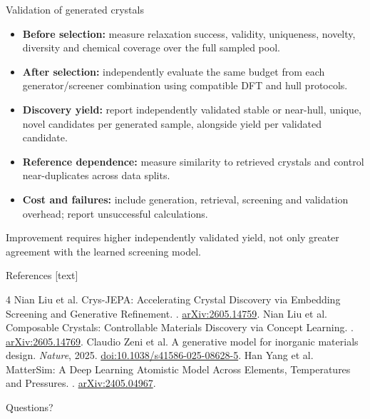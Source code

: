 \documentclass[10pt,aspectratio=169]{beamer}
\begin{document}
\begin{frame}{Validation of generated crystals}
\begin{itemize}\setlength\itemsep{3mm}
\item \textbf{Before selection:} measure relaxation success, validity, uniqueness, novelty, diversity and chemical coverage over the full sampled pool.
\item \textbf{After selection:} independently evaluate the same budget from each generator/screener combination using compatible DFT and hull protocols.
\item \textbf{Discovery yield:} report independently validated stable or near-hull, unique, novel candidates per generated sample, alongside yield per validated candidate.
\item \textbf{Reference dependence:} measure similarity to retrieved crystals and control near-duplicates across data splits.
\item \textbf{Cost and failures:} include generation, retrieval, screening and validation overhead; report unsuccessful calculations.
\end{itemize}
\vspace{3mm}
Improvement requires higher independently validated yield, not only greater agreement with the learned screening model.
\end{frame}

\begin{frame}{References}
\footnotesize
{}[text]
\begin{thebibliography}{4}
 Nian Liu et al.
\newblock Crys-JEPA: Accelerating Crystal Discovery via Embedding Screening and Generative Refinement.
. \href{https://arxiv.org/abs/2605.14759}{arXiv:2605.14759}.
 Nian Liu et al.
\newblock Composable Crystals: Controllable Materials Discovery via Concept Learning.
. \href{https://arxiv.org/abs/2605.14769}{arXiv:2605.14769}.
 Claudio Zeni et al.
\newblock A generative model for inorganic materials design.
\newblock \emph{Nature}, 2025. \href{https://doi.org/10.1038/s41586-025-08628-5}{doi:10.1038/s41586-025-08628-5}.
 Han Yang et al.
\newblock MatterSim: A Deep Learning Atomistic Model Across Elements, Temperatures and Pressures.
. \href{https://arxiv.org/abs/2405.04967}{arXiv:2405.04967}.
\end{thebibliography}
\end{frame}

\begin{frame}
\centering\Huge\color{navy} Questions?
\end{frame}
\end{document}
